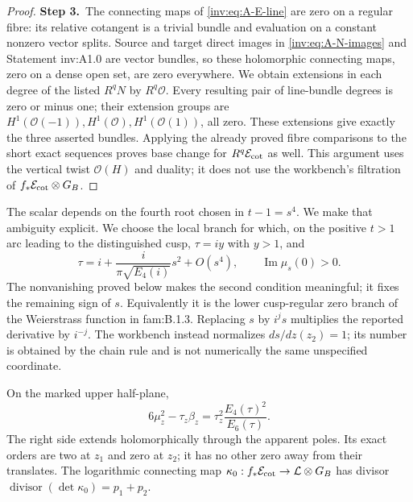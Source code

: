 \begin{proof}
\par\smallskip\noindent\textbf{Step 3.}\ The connecting maps of \eqref{inv:eq:A-E-line} are zero on a regular
fibre: its relative cotangent is a trivial bundle and evaluation on
a constant nonzero vector splits.  Source and target direct images
in \eqref{inv:eq:A-N-images} and Statement inv:A1.0 are vector bundles,
so these holomorphic connecting maps, zero on a dense open set, are
zero everywhere.  We obtain extensions in each degree of the listed
$R^qN$ by $R^q\mathcal O$.  Every resulting pair of line-bundle degrees is
zero or minus one; their extension groups are
$H^1(\mathcal O(-1)),H^1(\mathcal O),H^1(\mathcal O(1))$, all zero.  These extensions
give exactly the three asserted bundles.  Applying the already proved
fibre comparisons to the short exact sequences proves base change
for $R^q\mathcal E_{\rm cot}$ as well.  This argument uses the vertical twist
$\mathcal O(H)$ and duality; it does not use the workbench's filtration of
$f_*\mathcal E_{\rm cot}\otimes G_B$.
\end{proof}

\begin{definition}\label{inv:notation-period-branch}
The scalar depends on the fourth root chosen in $t-1=s^4$.  We make
that ambiguity explicit.  We choose the local branch for which, on
the positive $t>1$ arc leading to the distinguished cusp,
$\tau=iy$ with $y>1$, and
\begin{equation}\label{inv:eq:A-s-branch}
\tau=i+\frac{i}{\pi\sqrt{E_4(i)}}s^2+O(s^4),\qquad
\operatorname{Im}\mu_s(0)>0.
\end{equation}
The nonvanishing proved below makes the second condition meaningful;
it fixes the remaining sign of $s$.  Equivalently it is the lower
cusp-regular zero branch of the Weierstrass function in fam:B.1.3.
Replacing $s$ by $i^js$ multiplies the reported derivative by $i^{-j}$.
The workbench instead normalizes $ds/dz(z_2)=1$; its number is obtained
by the chain rule and is not numerically the same unspecified coordinate.
\end{definition}

\begin{theorem}\label{inv:A2.1}
On the marked upper half-plane,
\begin{equation}\label{inv:eq:A-modular-K}
6\mu_z^2-\tau_z\beta_z
=\tau_z^2\frac{E_4(\tau)^2}{E_6(\tau)}.
\end{equation}
The right side extends holomorphically through the apparent poles.
Its exact orders are two at $z_1$ and zero at $z_2$; it has no other
zero away from their translates.  The logarithmic connecting map
$\kappa_0:f_*\mathcal E_{\rm cot}\to\mathcal L\otimes G_B$ has divisor
$\operatorname{divisor}(\det\kappa_0)=p_1+p_2$.
\end{theorem}


